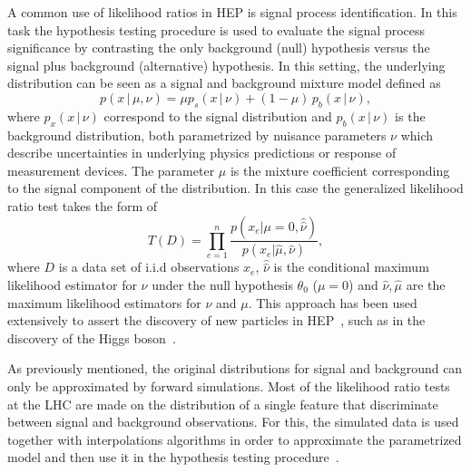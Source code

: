 \documentclass[a4paper]{jpconf}
\begin{document}
A common use of likelihood ratios in HEP is signal process identification. In this task the hypothesis testing procedure is used to evaluate the signal process significance by contrasting the only background (null) hypothesis versus the signal plus background (alternative) hypothesis. In this setting, the underlying distribution can be seen as a signal and background mixture model defined as
\begin{equation}\label{eq:sigbkg}
p( x \,|\, \mu, \nu) =  \mu p_s( x \, |\,  \nu)  + (1-\mu)\, p_b( x \,|\, \nu) ,
\end{equation}
where $p_x(x \, |\, \nu)$ correspond to the signal distribution and $p_b(x \, |\, \nu)$ is the background distribution, both parametrized by nuisance parameters $\nu$ which describe uncertainties in underlying physics predictions or response of measurement devices. The parameter $\mu$ is the mixture coefficient corresponding to the signal component of the distribution. In this case the generalized likelihood ratio test takes the form of 
\begin{equation}
T(D) = \prod_{e=1}^n \frac{ p(x_e|\mu=0,\hat{\hat{\nu}})}{ p(x_e|\hat \mu, \hat \nu)},
\end{equation}
where $D$ is a data set of i.i.d observations $x_e$, $\hat {\hat \nu}$ is the conditional maximum likelihood estimator for $\nu$ under the null hypothesis $\theta_0$ ($\mu = 0$) and $\hat{\nu}, \hat{\mu}$ are the maximum likelihood estimators for $\nu$ and $\mu$. This approach has been used extensively to assert the discovery of new particles in HEP~\cite{Cowan:2010js}, such as in the discovery of the Higgs boson~\cite{Aad:2012tfa,Chatrchyan:2012ufa}.

As previously mentioned, the original distributions for signal and background can only be approximated by forward simulations. Most of the likelihood ratio tests at the LHC are made on the distribution of a single feature that discriminate between signal and background observations. For this, the simulated data is used together with interpolations algorithms in order to approximate the parametrized model and then use it in the hypothesis testing procedure~\cite{Cranmer:2012sba}.

\end{document}

